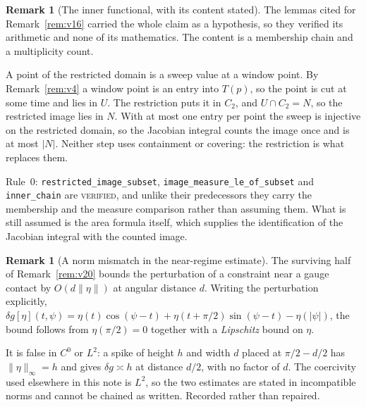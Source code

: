 \documentclass[11pt]{article}
\theoremstyle{definition}
\newtheorem{remark}[theorem]{Remark}
\begin{document}
\begin{remark}[The inner functional, with its content stated]\label{rem:v25}
The lemmas cited for Remark~\ref{rem:v16} carried the whole claim as a hypothesis, so they
verified its arithmetic and none of its mathematics. The content is a membership chain and a
multiplicity count.

A point of the restricted domain is a sweep value at a window point. By
Remark~\ref{rem:v4} a window point is an entry into $T(p)$, so the point is cut at some time
and lies in $U$. The restriction puts it in $C_2$, and $U\cap C_2=N$, so the restricted image
lies in $N$. With at most one entry per point the sweep is injective on the restricted domain,
so the Jacobian integral counts the image once and is at most $|N|$. Neither step uses
containment or covering: the restriction is what replaces them.

Rule~0: \verb|restricted_image_subset|, \verb|image_measure_le_of_subset| and
\verb|inner_chain| are \textsc{verified}, and unlike their predecessors they carry the
membership and the measure comparison rather than assuming them. What is still assumed is the
area formula itself, which supplies the identification of the Jacobian integral with the
counted image.
\end{remark}

\begin{remark}[A norm mismatch in the near-regime estimate]\label{rem:v26}
The surviving half of Remark~\ref{rem:v20} bounds the perturbation of a constraint near a
gauge contact by $O(d\|\eta\|)$ at angular distance $d$. Writing the perturbation explicitly,
$\delta g[\eta](t,\psi)=\eta(t)\cos(\psi-t)+\eta(t+\pi/2)\sin(\psi-t)-\eta(|\psi|)$, the bound
follows from $\eta(\pi/2)=0$ together with a \emph{Lipschitz} bound on $\eta$.

It is false in $C^0$ or $L^2$: a spike of height $h$ and width $d$ placed at $\pi/2-d/2$ has
$\|\eta\|_\infty=h$ and gives $\delta g\asymp h$ at distance $d/2$, with no factor of $d$. The
coercivity used elsewhere in this note is $L^2$, so the two estimates are stated in
incompatible norms and cannot be chained as written. Recorded rather than repaired.
\end{remark}
\end{document}
